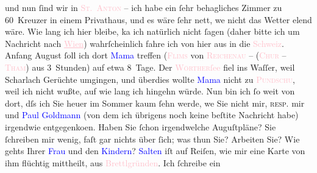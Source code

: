                und nun ſind wir in \textcolor{pink}{\textsc{St. Anton}}{}\ledrightnote{\textcolor{pink}{St. Anton am Arlberg}} – ich habe ein \introOben{}ſehr behagliches\introOben{}
               Zimmer zu 60 Kreuzer in einem Privat{\pb}haus, und es wäre
               ſehr nett, we{\geminationn} nicht das Wetter elend wäre. Wie lang ich
               hier bleibe, ka{\geminationn} ich natürlich \introOben{}nicht\introOben{} ſagen (daher bitte ich um Nachricht nach \textcolor{pink}{\uline{Wien}}{}\ledrightnote{\textcolor{pink}{Wien}}) wahrſcheinlich fahre ich von hier aus in die \textcolor{pink}{Schweiz}{}\ledrightnote{\textcolor{pink}{Schweiz}}. Anfang August ſoll ich dort \textcolor{blue}{Mama}{} treffen (\textcolor{pink}{\textsc{Flims}}{}\ledrightnote{\textcolor{pink}{Flims}} von \textcolor{pink}{\textsc{Reichenau}}{}\ledrightnote{\textcolor{pink}{Reichenau}} – (\textcolor{pink}{\textsc{Chur}}{}\ledrightnote{\textcolor{pink}{Chur}} – \textcolor{pink}{\textsc{Tham}}{}\ledrightnote{\textcolor{pink}{Tamins}}) aus 3 Stunden) auf etwa {\pb}8 Tage. Der \textcolor{pink}{\textsc{Wörther}ſee}{}\ledrightnote{\textcolor{pink}{Wörthersee}} fiel ins Waſſer, weil Scharlach Gerüchte
               umgingen, und überdies wollte \textcolor{blue}{Mama}{} nicht zu \textcolor{pink}{\textsc{Pundschu}}{}\ledrightnote{\textcolor{pink}{Pension Pundschu}}, weil ich nicht
               wußte, auf wie lang ich hingehn würde. Nun bin ich ſo weit von dort, dſs ich Sie
               heuer im Sommer kaum ſehn werde, we{\geminationn} Sie nicht mir, \textsc{resp}. mir und {\pb}\textcolor{blue}{Paul Goldmann}{}\ledrightnote{\textcolor{blue}{Paul Goldmann}} (von dem ich übrigens noch keine
                  beſti{\geminationm}te Nachricht habe) irgendwie entgegenko{\geminationm}en.\pend
           \pstart
           Haben Sie ſchon irgendwelche Auguſtpläne? Sie ſchreiben mir wenig, faſt gar nichts
               über ſich; was thun Sie? Arbeiten Sie? Wie gehts Ihrer \textcolor{blue}{Frau}{} und den \textcolor{blue}{Kindern}{}?\pend
           \pstart
           \textcolor{blue}{Salten}{}\ledrightnote{\textcolor{blue}{Felix Salten}} iſt auf Reiſen, {\pb}wie mir eine Karte von ihm flüchtig mittheilt, aus \textcolor{pink}{Brettlgründen}{}. Ich ſchreibe ein
